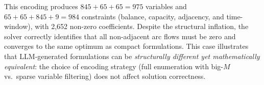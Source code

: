 \documentclass[preprint,12pt]{elsarticle}
\begin{document}
This encoding produces $845 + 65 + 65 = 975$ variables and $65 + 65 + 845 + 9 = 984$ constraints (balance, capacity, adjacency, and time-window), with 2,652 non-zero coefficients. Despite the structural inflation, the solver correctly identifies that all non-adjacent arc flows must be zero and converges to the same optimum as compact formulations. This case illustrates that LLM-generated formulations can be \emph{structurally different yet mathematically equivalent}: the choice of encoding strategy (full enumeration with big-$M$ vs.\ sparse variable filtering) does not affect solution correctness.

\newpage











\end{document}

